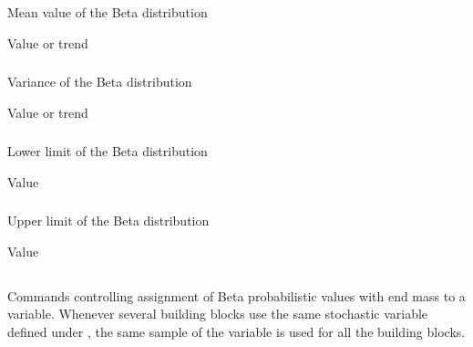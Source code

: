 {\subsubsection{}
 \slist
   \item \Description Mean value of the Beta distribution
   \item \Argument Value or trend
   \item \Default
 \elist

\subsubsection{}
 \slist
   \item \Description Variance of the Beta distribution
   \item \Argument Value or trend
   \item \Default
 \elist

\subsubsection{}
 \slist
   \item \Description Lower limit of the Beta distribution
   \item \Argument Value
   \item {}
 \elist

\subsubsection{}
 \slist
   \item \Description Upper limit of the Beta distribution
   \item \Argument Value
   \item {}
 \elist

\subsection{}
 \slist
   \item \Description Commands controlling assignment of Beta probabilistic values with end mass to a variable. Whenever several building blocks use the same stochastic variable defined under , the same sample of the variable is used for all the building blocks.
   \item \Argument
   \item \Default
 \elist

}
